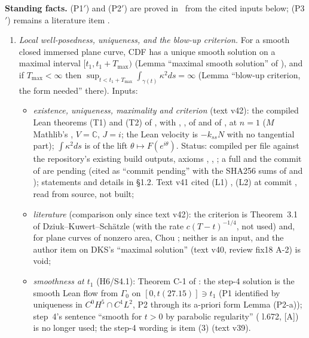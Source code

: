 \documentclass[11pt]{article}
\begin{document}
\noindent\textbf{Standing facts.} (P1$'$) and (P2$'$) are proved in  \tH\ from the cited inputs below; (P3$'$) remains a literature item \tH.
\begin{enumerate}[label=(P\arabic*$'$),leftmargin=3em]
\item \emph{Local well-posedness, uniqueness, and the blow-up criterion.} For a smooth closed immersed plane curve, CDF has a unique smooth solution on a maximal interval $[t_1,t_1+T_{\max})$ (Lemma ``maximal smooth solution'' of ), and if $T_{\max}<\infty$ then $\sup_{t<t_1+T_{\max}}\int_{\gamma(t)}\kappa^2ds=\infty$ (Lemma ``blow-up criterion, the form needed'' there). Inputs:
  \begin{itemize}[leftmargin=*]
  \item \emph{existence, uniqueness, maximality and criterion} (text v42): the compiled Lean theorems  (T1) and  (T2) of , with , ,  of  and  of  \cite{CWFlow}, at $n=1$ ($M$ Mathlib's , $V=\mathbb C$, $J=i$; the Lean velocity is $-k_{ss}N$ with no tangential part); $\int\kappa^2ds$ is  of the lift $\theta\mapsto F(e^{i\theta})$. Status: compiled per file against the repository's existing build outputs, axioms , , ; a full  and the commit of  are pending (cited as ``commit pending'' with the SHA256 sums of  and ); statements and details in  \S1.2. Text v41 cited (L1) , (L2)  at commit , read from source, not built;
  \item \emph{literature} (comparison only since text v42): the criterion is Theorem~3.1 of Dziuk--Kuwert--Sch\"atzle \cite{DKS2002} (with the rate $c(T-t)^{-1/4}$, not used) and, for plane curves of nonzero area, Chou \cite{Chou2003}; neither is an input, and the author item on DKS's ``maximal solution'' (text v40, review fix18 A-2) is void;
  \item \emph{smoothness at $t_1$} (H6/S4.1): Theorem C-1 of  \tHd: the step-4 solution is the smooth Lean flow from $\Gamma_0$ on $[0,t(27.15)]\ni t_1$ (P1 identified by uniqueness in $C^0H^5\cap C^1L^2$, P2 through its a-priori form Lemma (P2-a)); step~4's sentence ``smooth for $t>0$ by parabolic regularity'' ( l.672, [A]) is no longer used; the step-4 wording is  item (3) (text v39).

\end{itemize}
\end{enumerate}
\end{document}
